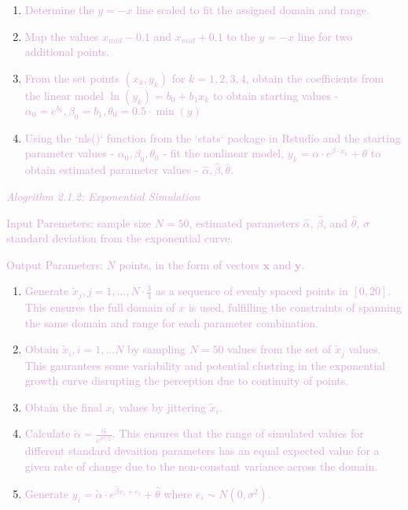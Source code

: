 \documentclass[]{interact}
\theoremstyle{plain}%
\theoremstyle{definition}
\theoremstyle{remark}
\begin{document}
\begin{enumerate}
\def\labelenumi{\arabic{enumi}.}
\item
  \textcolor{Plum}{Determine the $y=-x$ line scaled to fit the assigned domain and range.}
\item
  \textcolor{Plum}{Map the values $x_{mid} - 0.1$ and $x_{mid} + 0.1$ to the $y=-x$ line for two additional points.}
\item
  \textcolor{Plum}{From the set points $(x_k, y_k)$ for $k = 1,2,3,4$, obtain the coefficients from the linear model $\ln(y_k) = b_0 +b_1x_k$ to obtain starting values - $\alpha_0 = e^{b_0}, \beta_0 =  b_1, \theta_0 = 0.5\cdot \min(y)$}
\item
  \textcolor{Plum}{Using the `nls()` function from the `stats` package in Rstudio and the starting parameter values - $\alpha_0, \beta_0, \theta_0$ - fit the nonlinear model, $y_k = \alpha\cdot e^{\beta\cdot x_k}+\theta$ to obtain estimated parameter values - $\hat\alpha, \hat\beta, \hat\theta.$}
\end{enumerate}

\textcolor{Plum}{\textit{Alogrithm 2.1.2: Exponential Simulation}}

\textcolor{Plum}{Input Paremeters: sample size $N = 50$, estimated parameters $\hat\alpha$, $\hat\beta$, and $\hat\theta$, $\sigma$ standard deviation from the exponential curve.}

\textcolor{Plum}{Output Parameters: $N$ points, in the form of vectors $\mathbf{x}$ and $\mathbf{y}$.}

\begin{enumerate}
\def\labelenumi{\arabic{enumi}.}
\item
  \textcolor{Plum}{Generate $\tilde x_j, j = 1,..., N\cdot \frac{3}{4}$ as a sequence of evenly spaced points in $[0,20]$. This ensures the full domain of $x$ is used, fulfilling the constraints of spanning the same domain and range for each parameter combination.}
\item
  \textcolor{Plum}{Obtain $\tilde x_i, i = 1,...N$ by sampling $N = 50$ values from the set of $\tilde x_j$ values. This gaurantees some variability and potential clustring in the exponential growth curve disrupting the perception due to continuity of points.}
\item
  \textcolor{Plum}{Obtain the final $x_i$ values by jittering $\tilde x_i$.}
\item
  \textcolor{Plum}{Calculate $\tilde\alpha = \frac{\hat\alpha}{e^{\sigma^2/2}}.$ This ensures that the range of simulated values for different standard devaition parameters has an equal expected value for a given rate of change due to the non-constant variance across the domain.}
\item
  \textcolor{Plum}{Generate $y_i = \tilde\alpha\cdot e^{\hat\beta x_i + e_i}+\hat\theta$ where $e_i\sim N(0,\sigma^2).$}
\end{enumerate}
\end{document}
